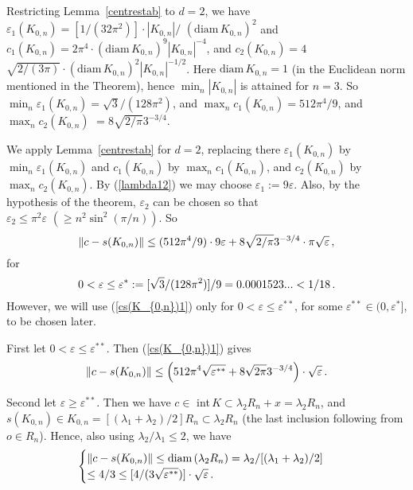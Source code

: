 \documentclass[12pt]{article}
\begin{document}
Restricting Lemma~\ref{centrestab} to $d=2$, we have
$\varepsilon _1(K_{0,n})=[1/(32 \pi ^2)] \cdot |K_{0,n}|/$
\newline
$({\text{diam}}\,K_{0,n})^2$
and $c_1(K_{0,n})=2 \pi ^4 \cdot ({\text{diam}}\,K_{0,n})^9|K_{0,n}|^{-4}$,
and $c_2(K_{0,n})=4 $
\newline
$\sqrt{2/(3 \pi )} \cdot ({\text{diam}}\,K_{0,n})^2|K_{0,n}|^{-1/2}$. 
Here ${\text{diam}}\,K_{0,n}=1$ (in the Euclidean norm mentioned 
in the Theorem), hence $\min _n |K_{0,n}|$ 
is attained for $n=3$. So
$\min _n  \varepsilon _1(K_{0,n})=\sqrt{3}/(128 \pi ^2)$, and
$\max _n c_1(K_{0,n})=512 \pi ^4 /9$, and $\max _n c_2(K_{0,n})$
\newline
$ =8\sqrt{2/\pi } 3^{-3/4}$.

We apply Lemma~\ref{centrestab} for $d=2$, replacing 
there
$\varepsilon _1(K_{0,n})$ by $\min _n  
\varepsilon _1(K_{0,n})$ and $c_1(K_{0,n})$ by $\max _n
c_1(K_{0,n})$, and $c_2(K_{0,n})$ by $\max _n 
c_2(K_{0,n})$. By 
(\ref{lambda12}) we may choose
$\varepsilon _1 := 9 \varepsilon $. Also, by the hypothesis of the theorem,
$\varepsilon _2$ can be chosen so that  
$\varepsilon _2 \le \pi ^2 \varepsilon  \,\,\left( \ge n^2 \sin ^2( \pi /n )
\right)$. So 
\begin{equation}
\label{cs(K_{0,n})1}
\|c-s(K_{0,n})\|  \le  (512 \pi ^4 /9) 
\cdot 9 \varepsilon + 
8\sqrt{2/\pi } 3^{-3/4} \cdot 
\pi \sqrt{\varepsilon }\,,
\end{equation}
for 
\begin{equation}
\label{cs(K_{0,n})2}
0 < \varepsilon \le \varepsilon ^* 
:=[\sqrt{3}/(128 \pi ^2)]/9 =0.0001523... < 1/18\,.
\end{equation}
However, we will use (\ref{cs(K_{0,n})1}) only for 
$0 < \varepsilon \le \varepsilon ^{**}$, for some
$\varepsilon ^{**} \in (0, \varepsilon ^*]$, 
to be chosen later.

First let $0 < \varepsilon \le \varepsilon ^{**}$.
Then (\ref{cs(K_{0,n})1}) gives
\begin{equation}
\label{cs(K_{0,n})3}
\|c-s(K_{0,n})\|  \le \left( 512 \pi ^4 
\sqrt{\varepsilon ^{**}}
+8\sqrt{2 \pi } 3^{-3/4} \right) \cdot
\sqrt{ \varepsilon }\,.
\end{equation}

Second let $\varepsilon \ge  \varepsilon ^{**}$.
Then we have $c \in $ int\,$K \subset \lambda _2 R_n +x= \lambda _2 R_n $, 
and $s(K_{0,n}) \in K_{0,n} =[(\lambda _1 + \lambda _2)/2]R_n \subset 
\lambda _2 R_n $ (the last inclusion following from $o \in R_n$). 
Hence, also using $\lambda _2 / \lambda _1 \le 2$, we have  
\begin{equation}
\label{cs(K_{0,n})4}
\begin{cases}
\|c-s(K_{0,n})\| \le {\text{diam}}\,(\lambda _2 R_n)=
\lambda _2 /[(\lambda _1+ \lambda _2)/2] \\
\le 4/3
\le [4/(3 \sqrt{\varepsilon ^{**}})] \cdot
\sqrt{ \varepsilon }\,.
\end{cases}
\end{equation}
\end{document}
